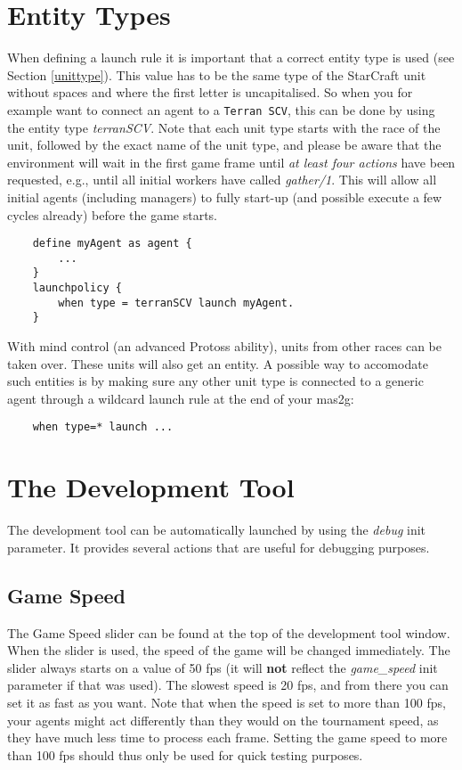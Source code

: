 \section{Entity Types}
When defining a launch rule it is important that a correct entity type is used (see Section \ref{unittype}). This value has to be the same type of the StarCraft unit without spaces and where the first letter is uncapitalised. So when you for example want to connect an agent to a \texttt{Terran SCV}, this can be done by using the entity type \textit{terranSCV}. Note that each unit type starts with the race of the unit, followed by the exact name of the unit type, and please be aware that the environment will wait in the first game frame until \textit{at least four actions} have been requested, e.g., until all initial workers have called \textit{gather/1}. This will allow all initial agents (including managers) to fully start-up (and possible execute a few cycles already) before the game starts.

\begin{verbatim}
    define myAgent as agent {
        ...
    }
    launchpolicy {
        when type = terranSCV launch myAgent.
    }
\end{verbatim}

\noindent With mind control (an advanced Protoss ability), units from other races can be taken over. These units will also get an entity. A possible way to accomodate such entities is by making sure any other unit type is connected to a generic agent through a wildcard launch rule at the end of your mas2g: \begin{verbatim}
    when type=* launch ...
\end{verbatim}

\pagebreak

\section{The Development Tool}
\label{development tool}
The development tool can be automatically launched by using the \textit{debug} init parameter. It provides several actions that are useful for debugging purposes.

\subsection{Game Speed}
The Game Speed slider can be found at the top of the development tool window. When the slider is used, the speed of the game will be changed immediately. The slider always starts on a value of 50 fps (it will \textbf{not} reflect the \textit{game\_speed} init parameter if that was used). The slowest speed is 20 fps, and from there you can set it as fast as you want. 
Note that when the speed is set to more than 100 fps, your agents might act differently than they would on the tournament speed, as they have much less time to process each frame. Setting the game speed to more than 100 fps should thus only be used for quick testing purposes.

